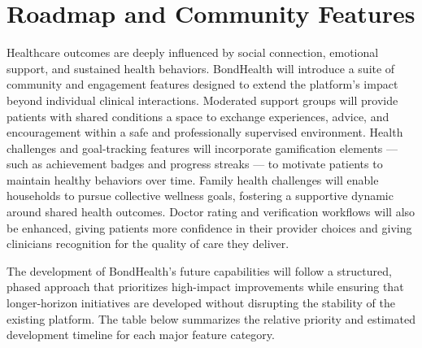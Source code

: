 \section{Roadmap and Community Features}

\noindent Healthcare outcomes are deeply influenced by social connection, emotional support, and sustained health behaviors. BondHealth will introduce a suite of community and engagement features designed to extend the platform's impact beyond individual clinical interactions. Moderated support groups will provide patients with shared conditions a space to exchange experiences, advice, and encouragement within a safe and professionally supervised environment. Health challenges and goal-tracking features will incorporate gamification elements --- such as achievement badges and progress streaks --- to motivate patients to maintain healthy behaviors over time. Family health challenges will enable households to pursue collective wellness goals, fostering a supportive dynamic around shared health outcomes. Doctor rating and verification workflows will also be enhanced, giving patients more confidence in their provider choices and giving clinicians recognition for the quality of care they deliver.

\noindent The development of BondHealth's future capabilities will follow a structured, phased approach that prioritizes high-impact improvements while ensuring that longer-horizon initiatives are developed without disrupting the stability of the existing platform. The table below summarizes the relative priority and estimated development timeline for each major feature category.


